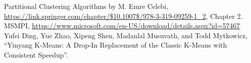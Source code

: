 \documentclass[conference]{IEEEtran}
\begin{document}
\begin{thebibliography}{00}
   Partitional Clustering Algorithms by M. Emre Celebi, \url{https://link.springer.com/chapter/$10.1007$/978-3-319-09259-1_2}, Chapter 2.
   MSMPI, \url{https://www.microsoft.com/en-US/download/details.aspx?id=57467}
   Yufei Ding, Yue Zhao, Xipeng Shen, Madanlal Musuvath,  and Todd Mytkowicz, ``Yinyang K-Means: A Drop-In Replacement of the Classic K-Means with Consistent Speedup''.
\end{thebibliography}
\end{document}
